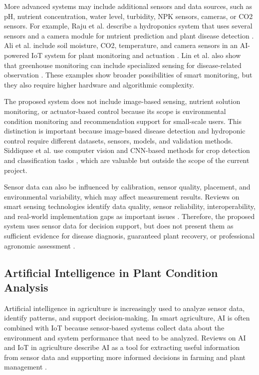 More advanced systems may include additional sensors and data sources, such as pH, nutrient concentration, water level, turbidity, NPK sensors, cameras, or CO2 sensors. For example, Raju et al. describe a hydroponics system that uses several sensors and a camera module for nutrient prediction and plant disease detection \cite{raju2022hydroponics}. Ali et al. include soil moisture, CO2, temperature, and camera sensors in an AI-powered IoT system for plant monitoring and actuation \cite{ali2024automated}. Lin et al. also show that greenhouse monitoring can include specialized sensing for disease-related observation \cite{lin2025spore}. These examples show broader possibilities of smart monitoring, but they also require higher hardware and algorithmic complexity.

The proposed system does not include image-based sensing, nutrient solution monitoring, or actuator-based control because its scope is environmental condition monitoring and recommendation support for small-scale users. This distinction is important because image-based disease detection and hydroponic control require different datasets, sensors, models, and validation methods. Siddiquee et al. use computer vision and CNN-based methods for crop detection and classification tasks \cite{siddiquee2022algorithms}, which are valuable but outside the scope of the current project.

Sensor data can also be influenced by calibration, sensor quality, placement, and environmental variability, which may affect measurement results. Reviews on smart sensing technologies identify data quality, sensor reliability, interoperability, and real-world implementation gaps as important issues \cite{miller2025iot}. Therefore, the proposed system uses sensor data for decision support, but does not present them as sufficient evidence for disease diagnosis, guaranteed plant recovery, or professional agronomic assessment \cite{miller2025iot,nawaz2025iot}.
\subsection{Artificial Intelligence in Plant Condition Analysis}

Artificial intelligence in agriculture is increasingly used to analyze sensor data, identify patterns, and support decision-making. In smart agriculture, AI is often combined with IoT because sensor-based systems collect data about the environment and system performance that need to be analyzed. Reviews on AI and IoT in agriculture describe AI as a tool for extracting useful information from sensor data and supporting more informed decisions in farming and plant management \cite{miller2025iot,mansoor2025integration,alzubi2023artificial}.

